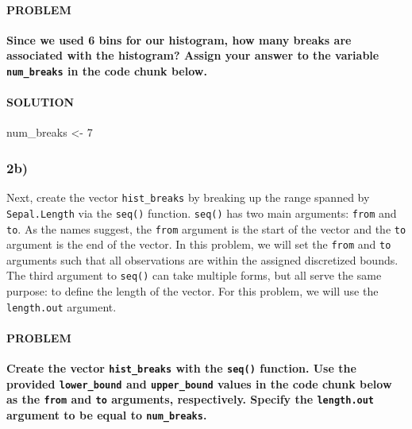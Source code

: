 \documentclass[]{article}
\newenvironment{Shaded}{\begin{snugshade}}{\end{snugshade}}
\newcommand{\DecValTok}[1]{\textcolor[rgb]{0.00,0.00,0.81}{#1}}
\newcommand{\NormalTok}[1]{#1}
\newcommand{\StringTok}[1]{\textcolor[rgb]{0.31,0.60,0.02}{#1}}
\let\oldparagraph\paragraph
\renewcommand{\paragraph}[1]{\oldparagraph{#1}\mbox{}}
\begin{document}
\hypertarget{problem-6}{%
\paragraph{PROBLEM}\label{problem-6}}

\textbf{Since we used 6 bins for our histogram, how many breaks are
associated with the histogram? Assign your answer to the variable
\texttt{num\_breaks} in the code chunk below.}

\hypertarget{solution-5}{%
\paragraph{SOLUTION}\label{solution-5}}

\begin{Shaded}
\begin{Highlighting}[]
\NormalTok{num_breaks <-}\StringTok{ }\DecValTok{7}
\end{Highlighting}
\end{Shaded}

\hypertarget{b-1}{%
\subsubsection{2b)}\label{b-1}}

Next, create the vector \texttt{hist\_breaks} by breaking up the range
spanned by \texttt{Sepal.Length} via the \texttt{seq()} function.
\texttt{seq()} has two main arguments: \texttt{from} and \texttt{to}. As
the names suggest, the \texttt{from} argument is the start of the vector
and the \texttt{to} argument is the end of the vector. In this problem,
we will set the \texttt{from} and \texttt{to} arguments such that all
observations are within the assigned discretized bounds. The third
argument to \texttt{seq()} can take multiple forms, but all serve the
same purpose: to define the length of the vector. For this problem, we
will use the \texttt{length.out} argument.

\hypertarget{problem-7}{%
\paragraph{PROBLEM}\label{problem-7}}

\textbf{Create the vector \texttt{hist\_breaks} with the \texttt{seq()}
function. Use the provided \texttt{lower\_bound} and
\texttt{upper\_bound} values in the code chunk below as the
\texttt{from} and \texttt{to} arguments, respectively. Specify the
\texttt{length.out} argument to be equal to \texttt{num\_breaks}.}
\end{document}

